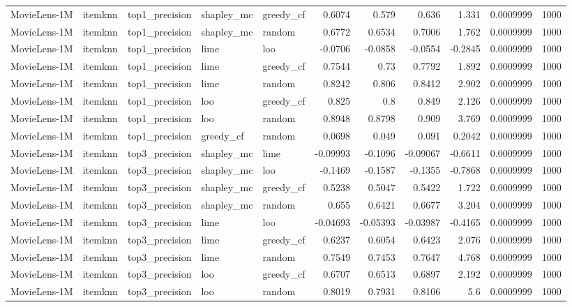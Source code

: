 \begin{table}[t]
\begin{tabular}{lllllrrrrrr}
MovieLens-1M & itemknn & top1\_precision & shapley\_mc & greedy\_cf & 0.6074 & 0.579 & 0.636 & 1.331 & 0.0009999 & 1000 \\
MovieLens-1M & itemknn & top1\_precision & shapley\_mc & random & 0.6772 & 0.6534 & 0.7006 & 1.762 & 0.0009999 & 1000 \\
MovieLens-1M & itemknn & top1\_precision & lime & loo & -0.0706 & -0.0858 & -0.0554 & -0.2845 & 0.0009999 & 1000 \\
MovieLens-1M & itemknn & top1\_precision & lime & greedy\_cf & 0.7544 & 0.73 & 0.7792 & 1.892 & 0.0009999 & 1000 \\
MovieLens-1M & itemknn & top1\_precision & lime & random & 0.8242 & 0.806 & 0.8412 & 2.902 & 0.0009999 & 1000 \\
MovieLens-1M & itemknn & top1\_precision & loo & greedy\_cf & 0.825 & 0.8 & 0.849 & 2.126 & 0.0009999 & 1000 \\
MovieLens-1M & itemknn & top1\_precision & loo & random & 0.8948 & 0.8798 & 0.909 & 3.769 & 0.0009999 & 1000 \\
MovieLens-1M & itemknn & top1\_precision & greedy\_cf & random & 0.0698 & 0.049 & 0.091 & 0.2042 & 0.0009999 & 1000 \\
MovieLens-1M & itemknn & top3\_precision & shapley\_mc & lime & -0.09993 & -0.1096 & -0.09067 & -0.6611 & 0.0009999 & 1000 \\
MovieLens-1M & itemknn & top3\_precision & shapley\_mc & loo & -0.1469 & -0.1587 & -0.1355 & -0.7868 & 0.0009999 & 1000 \\
MovieLens-1M & itemknn & top3\_precision & shapley\_mc & greedy\_cf & 0.5238 & 0.5047 & 0.5422 & 1.722 & 0.0009999 & 1000 \\
MovieLens-1M & itemknn & top3\_precision & shapley\_mc & random & 0.655 & 0.6421 & 0.6677 & 3.204 & 0.0009999 & 1000 \\
MovieLens-1M & itemknn & top3\_precision & lime & loo & -0.04693 & -0.05393 & -0.03987 & -0.4165 & 0.0009999 & 1000 \\
MovieLens-1M & itemknn & top3\_precision & lime & greedy\_cf & 0.6237 & 0.6054 & 0.6423 & 2.076 & 0.0009999 & 1000 \\
MovieLens-1M & itemknn & top3\_precision & lime & random & 0.7549 & 0.7453 & 0.7647 & 4.768 & 0.0009999 & 1000 \\
MovieLens-1M & itemknn & top3\_precision & loo & greedy\_cf & 0.6707 & 0.6513 & 0.6897 & 2.192 & 0.0009999 & 1000 \\
MovieLens-1M & itemknn & top3\_precision & loo & random & 0.8019 & 0.7931 & 0.8106 & 5.6 & 0.0009999 & 1000 \\

\end{tabular}
\end{table}
